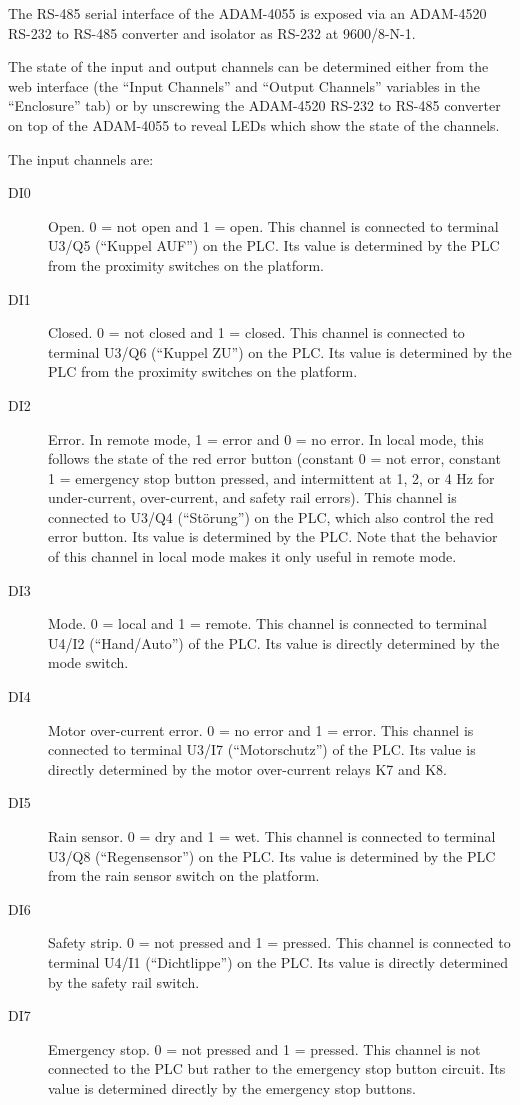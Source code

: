 The RS-485 serial interface of the ADAM-4055 is exposed via an ADAM-4520 RS-232 to RS-485 converter and isolator as RS-232 at 9600/8-N-1.

The state of the input and output channels can be determined either from the web interface (the “Input Channels” and “Output Channels” variables in the “Enclosure” tab) or by unscrewing the ADAM-4520 RS-232 to RS-485 converter on top of the ADAM-4055 to reveal LEDs which show the state of the channels.

The input channels are:
\begin{description}
\item[DI0] Open. 0 = not open and 1 = open. This channel is connected to terminal U3/Q5 (“Kuppel AUF”) on the PLC. Its value is determined by the PLC from the proximity switches on the platform.
\item[DI1] Closed. 0 = not closed and 1 = closed. This channel is connected to terminal U3/Q6 (“Kuppel ZU”) on the PLC. Its value is determined by the PLC from the proximity switches on the platform.
\item[DI2] Error. In remote mode, 1 = error and 0 = no error. In local mode, this follows the state of the red error button (constant 0 = not error, constant 1 = emergency stop button pressed, and intermittent at 1, 2, or 4 Hz for under-current, over-current, and safety rail errors). This channel is connected to U3/Q4 (“Störung”) on the PLC, which also control the red error button. Its value is determined by the PLC. Note that the behavior of this channel in local mode makes it only useful in remote mode.
\item[DI3] Mode. 0 = local and 1 = remote. This channel is connected to terminal U4/I2 (“Hand/Auto”) of the PLC. Its value is directly determined by the mode switch. 
\item[DI4] Motor over-current error. 0 = no error and 1 = error. This channel is connected to terminal U3/I7 (“Motorschutz”) of the PLC. Its value is directly determined by the motor over-current relays K7 and K8.
\item[DI5] Rain sensor. 0 = dry and 1 = wet. This channel is connected to terminal U3/Q8 (“Regensensor”) on the PLC. Its value is determined by the PLC from the rain sensor switch on the platform. 
\item[DI6] Safety strip. 0 = not pressed and 1 = pressed. This channel is connected to terminal U4/I1 (“Dichtlippe”) on the PLC. Its value is directly determined by the safety rail switch.
\item[DI7] Emergency stop. 0 = not pressed and 1 = pressed. This channel is not connected to the PLC but rather to the emergency stop button circuit. Its value is determined directly by the emergency stop buttons.
\end{description}

